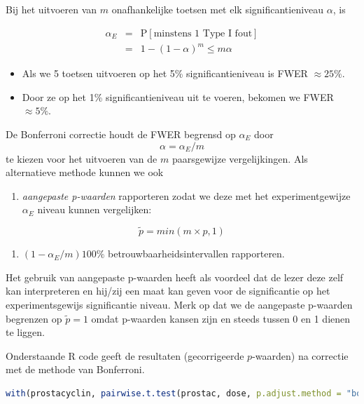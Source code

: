 \documentclass[
  12pt,dutch,coursenotes]{book}
\providecommand{\tightlist}{%
  \setlength{\itemsep}{0pt}\setlength{\parskip}{0pt}}
\theoremstyle{definition}
\theoremstyle{definition}
\theoremstyle{definition}
\theoremstyle{definition}
\theoremstyle{remark}
\begin{document}
Bij het uitvoeren van \(m\) onafhankelijke toetsen met elk significantieniveau \(\alpha\), is

\begin{eqnarray*}
\alpha_E&=&\text{P}[\text{minstens 1 Type I fout}]\\
&=&1-(1-\alpha)^m \leq m\alpha
\end{eqnarray*}

\begin{itemize}
\tightlist
\item
  Als we 5 toetsen uitvoeren op het 5\% significantieniveau is FWER \(\approx 25\%\).
\item
  Door ze op het 1\% significantieniveau uit te voeren, bekomen we FWER \(\approx 5\%\).
\end{itemize}

De Bonferroni correctie houdt de FWER begrensd op \(\alpha_E\) door \[\alpha=\alpha_E/m\] te kiezen voor het uitvoeren van de \(m\) paarsgewijze vergelijkingen.
Als alternatieve methode kunnen we ook

\begin{enumerate}
\def\labelenumi{\arabic{enumi}.}
\tightlist
\item
  \emph{aangepaste p-waarden} rapporteren zodat we deze met het experimentgewijze \(\alpha_E\) niveau kunnen vergelijken:
\end{enumerate}

\[\tilde{p}=min(m\times p,1)\]

\begin{enumerate}
\def\labelenumi{\arabic{enumi}.}
\setcounter{enumi}{1}
\tightlist
\item
  \((1-\alpha_E/m)100\%\) betrouwbaarheidsintervallen rapporteren.
\end{enumerate}

Het gebruik van aangepaste p-waarden heeft als voordeel dat de lezer deze zelf kan interpreteren en hij/zij een maat kan geven voor de significantie op het experimentsgewijs significantie niveau.
Merk op dat we de aangepaste p-waarden begrenzen op \(\tilde{p}=1\) omdat p-waarden kansen zijn en steeds tussen 0 en 1 dienen te liggen.

Onderstaande R code geeft de resultaten (gecorrigeerde \(p\)-waarden) na correctie met de methode van Bonferroni.

\begin{lstlisting}[language=R]
with(prostacyclin, pairwise.t.test(prostac, dose, p.adjust.method = "bonferroni"))
\end{lstlisting}
\end{document}

